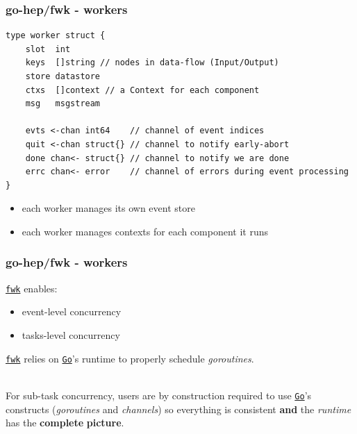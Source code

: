 \documentclass[9pt]{beamer}
\newcommand{\myblue} [1] {{\color{blue}#1}}
\begin{document}
\begin{frame}[fragile]
\frametitle{go-hep/fwk - workers}


\begin{verbatim}
type worker struct {
	slot  int
	keys  []string // nodes in data-flow (Input/Output)
	store datastore
	ctxs  []context // a Context for each component
	msg   msgstream

	evts <-chan int64    // channel of event indices
	quit <-chan struct{} // channel to notify early-abort
	done chan<- struct{} // channel to notify we are done
	errc chan<- error    // channel of errors during event processing
}

\end{verbatim}

\begin{itemize}
\item each worker manages its own event store
\item each worker manages contexts for each component it runs
\end{itemize}


\end{frame}

\begin{frame}[fragile]
\frametitle{go-hep/fwk - workers}


	\begin{block}{}
\myblue{\href{https://go-hep.org/x/hep/fwk}{\texttt{fwk}}} enables:


\begin{itemize}
\item event-level concurrency
\item tasks-level concurrency
\end{itemize}
	\end{block}{}

\myblue{\href{https://go-hep.org/x/hep/fwk}{\texttt{fwk}}} relies on \myblue{\href{https://golang.org}{\texttt{Go}}}'s runtime to properly schedule \emph{goroutines}.

\quad\\

For sub-task concurrency, users are by construction required to use \myblue{\href{https://golang.org}{\texttt{Go}}}'s constructs (\emph{goroutines} and \emph{channels}) so everything is consistent \textbf{and} the \emph{runtime} has the \textbf{complete} \textbf{picture}.



\end{frame}
\end{document}
